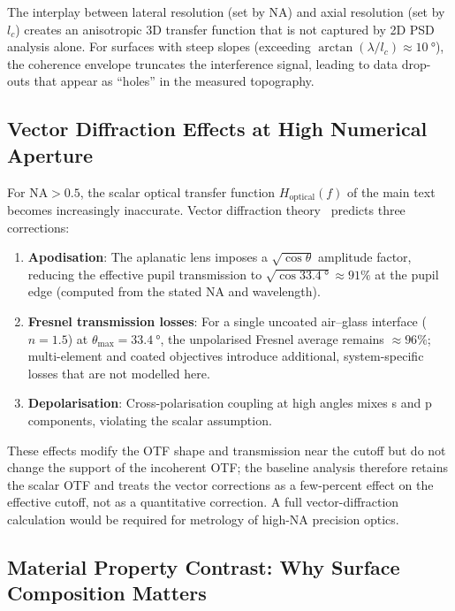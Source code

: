 \documentclass[review,12pt]{elsarticle}
\begin{document}
The interplay between lateral resolution (set by NA) and axial resolution (set by $l_c$) creates an anisotropic 3D transfer function that is not captured by 2D PSD analysis alone. For surfaces with steep slopes (exceeding $\arctan(\lambda/l_c) \approx \SI{10}{\degree}$), the coherence envelope truncates the interference signal, leading to data drop-outs that appear as ``holes'' in the measured topography.

\subsection{Vector Diffraction Effects at High Numerical Aperture}

For $\mathrm{NA} > 0.5$, the scalar optical transfer function $H_\mathrm{optical}(f)$ of the main text becomes increasingly inaccurate. Vector diffraction theory~\cite{richards1959electromagnetic} predicts three corrections:
\begin{enumerate}
    \item \textbf{Apodisation}: The aplanatic lens imposes a $\sqrt{\cos\theta}$ amplitude factor, reducing the effective pupil transmission to $\sqrt{\cos\SI{33.4}{\degree}} \approx 91\%$ at the pupil edge (computed from the stated NA and wavelength).
    \item \textbf{Fresnel transmission losses}: For a single uncoated air--glass interface ($n=1.5$) at $\theta_\mathrm{max} = \SI{33.4}{\degree}$, the unpolarised Fresnel average remains $\approx 96\%$; multi-element and coated objectives introduce additional, system-specific losses that are not modelled here.
    \item \textbf{Depolarisation}: Cross-polarisation coupling at high angles mixes s and p components, violating the scalar assumption.
\end{enumerate}
These effects modify the OTF shape and transmission near the cutoff but do not change the support of the incoherent OTF; the baseline analysis therefore retains the scalar OTF and treats the vector corrections as a few-percent effect on the effective cutoff, not as a quantitative correction. A full vector-diffraction calculation would be required for metrology of high-NA precision optics.

\subsection{Material Property Contrast: Why Surface Composition Matters}
\end{document}
